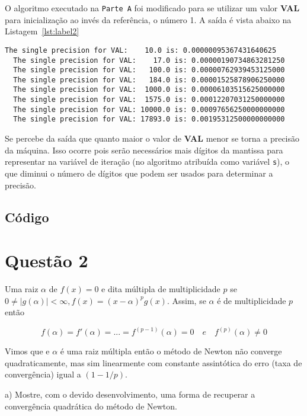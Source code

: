 \documentclass[12pt,a4paper,final]{article}
\begin{document}
O algoritmo executado na \texttt{Parte A} foi modificado para se utilizar um valor \textbf{VAL} para
inicialização ao invés da referência, o número 1. A saída é vista abaixo na Listagem~\ref{lst:label2}

\begin{lstlisting}[caption= \textbf{Precisão de máquina para diferentes valores VAL.},label={lst:label2}]
  The single precision for VAL:    10.0 is: 0.00000095367431640625
  The single precision for VAL:    17.0 is: 0.00000190734863281250
  The single precision for VAL:   100.0 is: 0.00000762939453125000
  The single precision for VAL:   184.0 is: 0.00001525878906250000
  The single precision for VAL:  1000.0 is: 0.00006103515625000000
  The single precision for VAL:  1575.0 is: 0.00012207031250000000
  The single precision for VAL: 10000.0 is: 0.00097656250000000000
  The single precision for VAL: 17893.0 is: 0.00195312500000000000
\end{lstlisting}

Se percebe da saída que quanto maior o valor de \textbf{VAL} menor se torna
a precisão da máquina. Isso ocorre pois serão necessários
mais dígitos da mantissa para representar na variável de iteração (no algoritmo
atribuída como variável \texttt{s}), o que diminui o número
de dígitos que podem ser usados para determinar a precisão.

\subsection*{Código}



\section{Questão 2}
Uma raiz $\alpha$ de $f(x) = 0$ e dita múltipla de multiplicidade $p$ se $ 0 \neq |g(\alpha)| < \infty, f(x) = (x - \alpha)^{p}g(x)$. Assim, se $\alpha$ é de multiplicidade $p$ então

 \[ f(\alpha) = f'(\alpha) = ... = f^{(p-1)}(\alpha) = 0 \quad e \quad f^{(p)}(\alpha) \neq 0 \]

Vimos que e $\alpha$ é uma raiz múltipla então o método de Newton não converge quadraticamente, mas
sim linearmente com constante assintótica do erro (taxa de convergência) igual a $(1−1/p)$.

a)  Mostre,  com  o  devido  desenvolvimento,  uma  forma  de  recuperar  a  convergência  quadrática  do
método de Newton.
\end{document}
